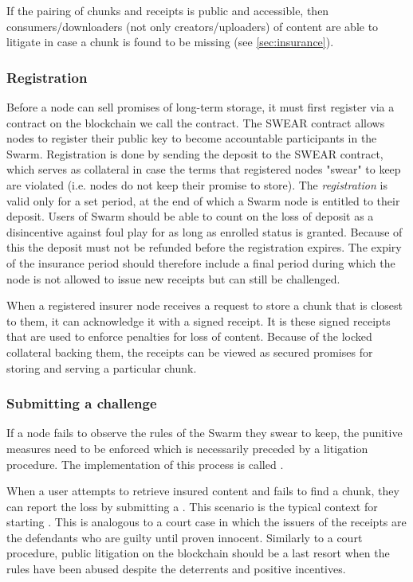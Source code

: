 If the pairing of chunks and receipts is public and accessible, then consumers/downloaders (not only creators/uploaders) of content are able to litigate in case a chunk is found to be missing (see \ref{sec:insurance}). 

\subsubsection{Registration}

Before a node can sell promises of long-term storage, it must first register via a contract on the blockchain we call the  contract. The SWEAR contract allows nodes to register their public key to become accountable participants in the Swarm. Registration is done by sending the deposit to the SWEAR contract, which serves as collateral in case the terms that registered nodes "swear" to keep are violated (i.e. nodes do not keep their promise to store). The \emph{registration} is valid only for a set period, at the end of which a Swarm node is entitled to their deposit. Users of Swarm should be able to count on the loss of deposit as a disincentive against foul play for as long as enrolled status is granted. Because of this the deposit must not be refunded before the registration expires. The expiry of the insurance period should therefore include a final period during which the node is not allowed to issue new receipts but can still be challenged.

When a registered insurer node receives a request to store a chunk that is closest to them, it can acknowledge it with a signed receipt. It is these signed receipts that are used to enforce penalties for loss of content. Because of the locked collateral backing them, the receipts can be viewed as secured promises for storing and serving a particular chunk.



\subsubsection{Submitting a challenge}


If a node fails to observe the rules of the Swarm they swear to keep, the punitive measures need to be enforced which is necessarily preceded by a litigation procedure. The implementation of this process is called .

When a user attempts to retrieve insured content and fails to find a chunk, they can report the loss by submitting a . This scenario is the typical context for starting . This is analogous to a court case in which the issuers of the receipts are the defendants who are guilty until proven innocent. Similarly to a court procedure, public litigation on the blockchain should be a last resort when the rules have been abused despite the deterrents and positive incentives.


